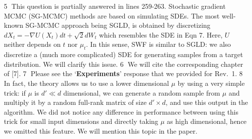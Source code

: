 \documentclass{article}
\newcommand{\rev}[1]{{\color{red} #1}}
\newcommand{\umut}[1]{{\color{blue} #1}}
\newcommand{\antoine}[1]{{\color{orange} #1}}
\newcommand{\ubul}[1]{{\large \color{red} \textcircled{\small #1}}}
\begin{document}
%
\ubul{5} This question is partially answered in lines 259-263. Stochastic gradient MCMC (SG-MCMC) methods are based on simulating SDEs. The most well-known SG-MCMC approach being SGLD, is obtained by discretizing $d X_t = - \nabla U(X_t) dt + \sqrt{2} dW_t$ which resembles the SDE in Eqn 7. Here, $U$ neither depends on $t$ nor $\mu_t$. In this sense, SWF is similar to SGLD: we also discretize a (much more complicated) SDE for generating samples from a target distribution. We will clarify this issue.
%
%
\ubul{6} We will cite the corresponding chapter of [7]. %
%
%
%
\ubul{7} Please see the `\textbf{Experiments}' response that we provided for Rev.\ 1.
%
%
\ubul{8} In fact, the theory allows us to use a lower dimensional $\mu$ by using
a very simple trick: if $\mu$ is $d' \ll d$ dimensional, we can generate a random sample from $\mu$ and multiply it by a random full-rank matrix of size $d' \times d$, and use this output in the algorithm. We did not notice any difference in performance between using this trick for small input dimensions and directly taking $\mu$ as high dimensional, hence we omitted this feature. We will mention this topic in the paper.
\end{document}

